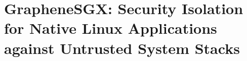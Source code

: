 
\chapter{GrapheneSGX: Security Isolation for Native Linux Applications against Untrusted System Stacks}










